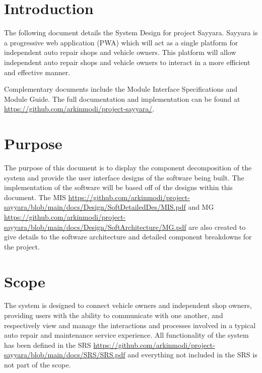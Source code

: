 \documentclass[12pt, titlepage]{article}
\begin{document}
\newpage

\tableofcontents

\newpage

\listoftables

\listoffigures

\newpage


\section{Introduction}

The following document details the System Design for project Sayyara. Sayyara is a progressive web
application (PWA) which will act as a single platform for independent auto repair shops and vehicle
owners. This platform will allow independent auto repair shops and vehicle owners to interact in a
more efficient and effective manner.

Complementary documents include the Module Interface Specifications and Module Guide. The full
documentation and implementation can be found at
\url{https://github.com/arkinmodi/project-sayyara/}.

\section{Purpose}

The purpose of this document is to display the component decomposition of the system and provide
the user interface designs of the software being built. The implementation of the software will be
based off of the designs within this document. The MIS
\url{https://github.com/arkinmodi/project-sayyara/blob/main/docs/Design/SoftDetailedDes/MIS.pdf}
and MG
\url{https://github.com/arkinmodi/project-sayyara/blob/main/docs/Design/SoftArchitecture/MG.pdf}
are also created to give details to the software architecture and detailed component breakdowns for
the project.

\section{Scope}

The system is designed to connect vehicle owners and independent shop owners, providing users with
the ability to communicate with one another, and respectively view and manage the interactions and
processes involved in a typical auto repair and maintenance service experience. All functionality
of the system has been defined in the SRS
\url{https://github.com/arkinmodi/project-sayyara/blob/main/docs/SRS/SRS.pdf} and everything not
included in the SRS is not part of the scope.
\end{document}
